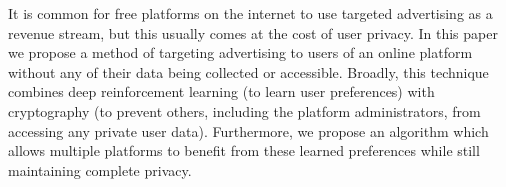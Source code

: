 It is common for free platforms on the internet to use targeted advertising as a revenue stream, but this usually comes at the cost of user privacy. In this paper we propose a method of targeting advertising to users of an online platform without any of their data being collected or accessible. Broadly, this technique combines deep reinforcement learning (to learn user preferences) with cryptography (to prevent others, including the platform administrators, from accessing any private user data). Furthermore, we propose an algorithm which allows multiple platforms to benefit from these learned preferences while still maintaining complete privacy.